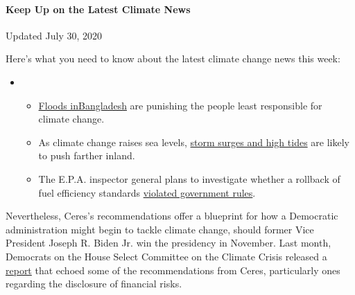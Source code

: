 \hypertarget{keep-up-on-the-latest-climate-news}{%
\paragraph{Keep Up on the Latest Climate
News}\label{keep-up-on-the-latest-climate-news}}

Updated July 30, 2020

Here's what you need to know about the latest climate change news this
week:

\begin{itemize}
\item
  \begin{itemize}
  \tightlist
  \item
    \href{https://www.nytimes3xbfgragh.onion/2020/07/30/climate/bangladesh-floods.html?action=click\&pgtype=Article\&state=default\&region=MAIN_CONTENT_1\&context=storylines_keepup}{Floods
    in}\href{https://www.nytimes3xbfgragh.onion/2020/07/30/climate/bangladesh-floods.html?action=click\&pgtype=Article\&state=default\&region=MAIN_CONTENT_1\&context=storylines_keepup}{Bangladesh}
    are punishing the people least responsible for climate change.
  \item
    As climate change raises sea levels,
    \href{https://www.nytimes3xbfgragh.onion/2020/07/30/climate/sea-level-inland-floods.html?action=click\&pgtype=Article\&state=default\&region=MAIN_CONTENT_1\&context=storylines_keepup}{storm
    surges and high tides} are likely to push farther inland.
  \item
    The E.P.A. inspector general plans to investigate whether a rollback
    of fuel efficiency standards
    \href{https://www.nytimes3xbfgragh.onion/2020/07/27/climate/trump-fuel-efficiency-rule.html?action=click\&pgtype=Article\&state=default\&region=MAIN_CONTENT_1\&context=storylines_keepup}{violated
    government rules}.
  \end{itemize}
\end{itemize}

Nevertheless, Ceres's recommendations offer a blueprint for how a
Democratic administration might begin to tackle climate change, should
former Vice President Joseph R. Biden Jr. win the presidency in
November. Last month, Democrats on the House Select Committee on the
Climate Crisis released a
\href{https://climatecrisis.house.gov/news/press-releases/climate-plan-press-release}{report}
that echoed some of the recommendations from Ceres, particularly ones
regarding the disclosure of financial risks.

